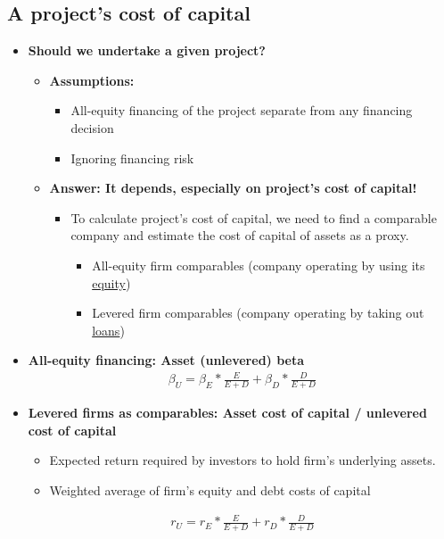 \documentclass[ieeetran]{article}
\begin{document}
\subsection{A project's cost of capital} %
\label{sub:a_project_}
\begin{itemize}
  \item \textbf{Should we undertake a given project?}
	  \begin{itemize}
	    \item \textbf{Assumptions:}
		    \begin{itemize}
		      \item All-equity financing of the project separate from any financing decision
			      \item Ignoring financing risk
		    \end{itemize}

\item \textbf{Answer: It depends, especially on project's cost of capital!}
	\begin{itemize}
	  \item To calculate project's cost of capital, we need to find a comparable company and estimate the cost of capital of assets as a proxy.
		  \begin{itemize}
		    \item All-equity firm comparables (company operating by using its \underline{equity})
		    \item Levered firm comparables (company operating by taking out \underline{loans})
		  \end{itemize}
	\end{itemize}
	  \end{itemize}
\item \textbf{All-equity financing: Asset (unlevered) beta}
	\large
	\begin{equation*}
	\boxed{
	\begin{aligned}
	\beta_U = \beta_E * \frac{E}{E + D} + \beta_D * \frac{D}{E+D}
	\end{aligned}
	}
	\end{equation*}
	\normalsize
	
\item \textbf{Levered firms as comparables: Asset cost of capital / unlevered cost of capital}
	\begin{itemize}
	  \item Expected return required by investors to hold firm's underlying assets.
	\item Weighted average of firm's equity and debt costs of capital
	\end{itemize}
	\large
	\begin{equation*}
	\boxed{
	\begin{aligned}
	r_U = r_E * \frac{E}{E + D} + r_D * \frac{D}{E + D}
	\end{aligned}
	}
	\end{equation*}
	\normalsize


\end{itemize}
\end{document}
